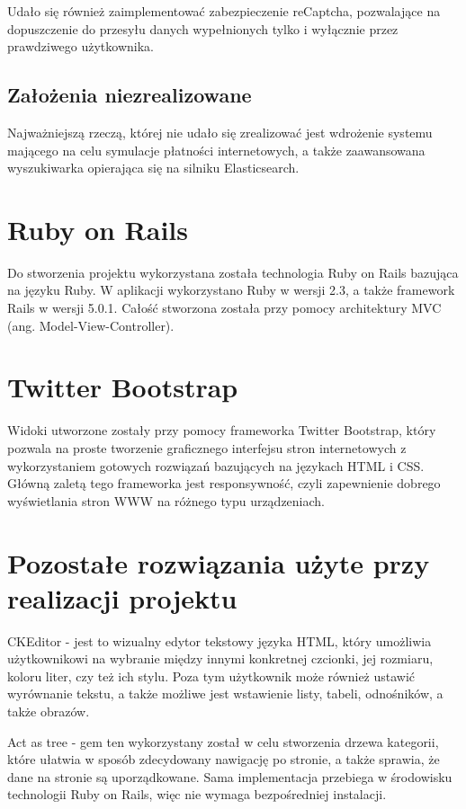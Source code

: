 \documentclass[brudnopis]{xmgr}
\begin{document}
Udało się również zaimplementować zabezpieczenie reCaptcha, pozwalające na dopuszczenie do przesyłu danych wypełnionych tylko i wyłącznie przez prawdziwego użytkownika.

\subsection{Założenia niezrealizowane}

Najważniejszą rzeczą, której nie udało się zrealizować jest wdrożenie systemu mającego na celu symulacje płatności internetowych, a także zaawansowana wyszukiwarka opierająca się na silniku Elasticsearch.

\section{Ruby on Rails}
Do stworzenia projektu wykorzystana została technologia Ruby on Rails bazująca na języku Ruby.
W aplikacji wykorzystano Ruby w wersji 2.3, a także framework Rails w wersji 5.0.1. Całość stworzona
została przy pomocy architektury MVC (ang. Model-View-Controller).

\section{Twitter Bootstrap}
Widoki utworzone zostały przy pomocy frameworka Twitter Bootstrap, który pozwala na proste tworzenie
graficznego interfejsu stron internetowych z wykorzystaniem gotowych rozwiązań bazujących na językach
HTML i CSS. Główną zaletą tego frameworka jest responsywność, czyli zapewnienie dobrego wyświetlania
stron WWW na różnego typu urządzeniach. 

\section{Pozostałe rozwiązania użyte przy realizacji projektu}

CKEditor - jest to wizualny edytor tekstowy języka HTML, który umożliwia użytkownikowi na wybranie między innymi konkretnej 
czcionki, jej rozmiaru, koloru liter, czy też ich stylu. Poza tym użytkownik może również ustawić wyrównanie tekstu,
a także możliwe jest wstawienie listy, tabeli, odnośników, a także obrazów.

Act as tree - gem ten wykorzystany został w celu stworzenia drzewa kategorii, które ułatwia w sposób zdecydowany nawigację
po stronie, a także sprawia, że dane na stronie są uporządkowane. Sama implementacja przebiega w środowisku
technologii Ruby on Rails, więc nie wymaga bezpośredniej instalacji.
\end{document}
